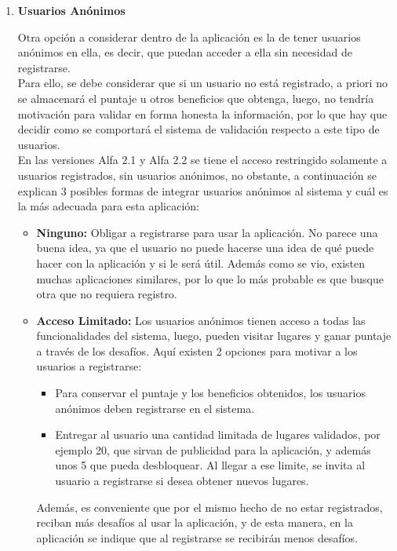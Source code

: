 \documentclass[10pt,letterpaper]{article}
\begin{document}
\begin{enumerate}
\item \textbf{Usuarios Anónimos}

Otra opción a considerar dentro de la aplicación es la de tener usuarios anónimos en ella, es decir, que puedan acceder a ella sin necesidad de registrarse.\\

Para ello, se debe considerar que si un usuario no está registrado, a priori no se almacenará el puntaje u otros beneficios que obtenga, luego, no tendría motivación para validar en forma honesta la información, por lo que hay que decidir como se comportará el sistema de validación respecto a este tipo de usuarios.\\

En las versiones Alfa 2.1 y Alfa 2.2 se tiene el acceso restringido solamente a usuarios registrados, sin usuarios anónimos, no obstante, a continuación se explican 3 posibles formas de integrar usuarios anónimos al sistema y cuál es la más adecuada para esta aplicación:\\

\begin{itemize}
 \item \textbf{Ninguno:} Obligar a registrarse para usar la aplicación. No parece una buena idea, ya que el usuario no puede hacerse una idea de qué puede hacer con la aplicación y si le será útil. Además como se vio, existen muchas aplicaciones similares, por lo que lo más probable es que busque otra que no requiera registro.\\
 \item \textbf{Acceso Limitado:} Los usuarios anónimos tienen acceso a todas las funcionalidades del sistema, luego, pueden visitar lugares y ganar puntaje a través de los desafíos. Aquí existen 2 opciones para motivar a los usuarios a registrarse:\\
  \begin{itemize}
  \item Para conservar el puntaje y los beneficios obtenidos, los usuarios anónimos deben registrarse en el sistema.
  \item Entregar al usuario una cantidad limitada de lugares validados, por ejemplo 20, que sirvan de publicidad para la aplicación, y además unos 5 que pueda desbloquear. Al llegar a ese limite, se invita al usuario a registrarse si desea obtener nuevos lugares.
  \end{itemize}
 Además, es conveniente que por el mismo hecho de no estar registrados, reciban más desafíos al usar la aplicación, y de esta manera, en la aplicación se indique que al registrarse se recibirán menos desafíos.
\end{itemize}


\end{enumerate}
\end{document}
